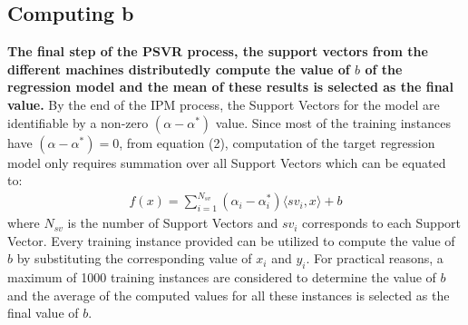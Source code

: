 \documentclass[12pt]{article}
\begin{document}
\subsection{Computing b}
\label{Comuting B}
  {\bf The final step of the PSVR process, the support vectors from the different machines distributedly compute the value of $b$ of the regression model and the mean of these results is selected as the final value.}
  \newline\newline
By the end of the IPM process, the Support Vectors for the model are identifiable by a non-zero $(\alpha - \alpha^*)$ value. Since most of the training instances have $(\alpha - \alpha^*) = 0$, from equation (2), computation of the target regression model only requires summation over all Support Vectors which can be equated to:
\begin{gather*}
f(x) = \sum_{i=1}^{N_{sv}}{(\alpha_{i} - \alpha^*_{i}) \langle sv_{i}, x \rangle} + b
\end{gather*}
where $N_{sv}$ is the number of Support Vectors and $sv_{i}$ corresponds to each Support Vector. Every training instance provided can be utilized to compute the value of $b$ by substituting the corresponding value of $x_{i}$ and $y_{i}$.
\newline
\newline For practical reasons, a maximum of 1000 training instances are considered to determine the value of $b$ and the average of the computed values for all these instances is selected as the final value of $b$.
\cleardoublepage
\end{document}
